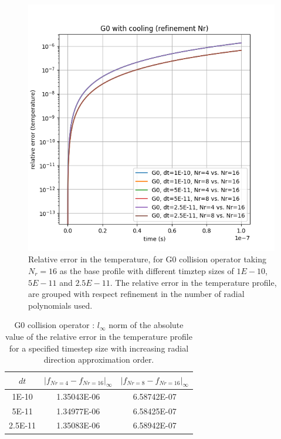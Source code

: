 \documentclass{article}
\begin{document}
\begin{figure}[H]
    \centering
    \includegraphics[width=0.99\textwidth]{dat/g0_nr.png}
    \caption{Relative error in the temperature, for G0 collision operator taking $N_r=16$ as the base profile with different timztep sizes of $1E-10$, $5E-11$ and $2.5E-11$. The relative error in the temperature profile, are grouped with respect refinement in the number of radial polynomials used. }
\end{figure}

\begin{table}[H]
    \centering
    \begin{tabular}{|c|c|c|}
        \hline
        $dt$ & $|f_{Nr=4}-f_{Nr=16}|_\infty$ & $|f_{Nr=8}-f_{Nr=16}|_\infty$ \\
        \hline
        1E-10        & 1.35043E-06  &    6.58742E-07 \\
        5E-11        & 1.34977E-06  &    6.58425E-07 \\
        2.5E-11      & 1.35083E-06  &    6.58942E-07 \\
        \hline
    \end{tabular}
    \caption{G0 collision operator : $l_\infty$ norm of the absolute value of the relative error in the temperature profile for a specified timestep size with increasing radial direction approximation order.  }
\end{table}
\end{document}
